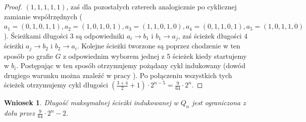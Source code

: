 \documentclass{pracamgr}
\newtheorem{corollary}[theorem]{Wniosek}
\begin{document}
\begin{proof}
      $(1,1,1,1,1)$, zaś dla pozostałych czterech analogicznie po cyklicznej zamianie współrzędnych\newline
      ($a_1=(0,1,0,1,1),a_2=(1,0,1,0,1),a_3=(1,1,0,1,0),a_4=(0,1,1,0,1),a_5=(1,0,1,1,0)$).
      Ścieżkami długości $3$ są odpowiedniki $a_i\rightarrow b_1$ i $b_1\rightarrow a_j$, zaś ścieżek długości $4$ ścieżki
      $a_j\rightarrow b_2$ i $b_2\rightarrow a_i$. Kolejne ścieżki tworzone są poprzez chodzenie w ten sposób po grafie $G$ z odpowiednim
      wyborem jednej z 5 ścieżek kiedy startujemy w $b_i$.
      Postępując w ten sposób otrzymujemy pożądany cykl indukowany (dowód drugiego warunku można znaleźć w pracy \cite{Snake2}).
      Po połączeniu wszystkich tych ścieżek otrzymujemy cykl długości $(\frac{3+4}{2}+1)\cdot 2^{n-5}=\frac{9}{64}\cdot2^n$.
     \end{proof} 
     \begin{corollary}
      Długość maksymalnej ścieżki indukowanej w $Q_n$ jest ograniczona z dołu przez $\frac{9}{64}\cdot 2^n-2$.
     \end{corollary}
\end{document}
